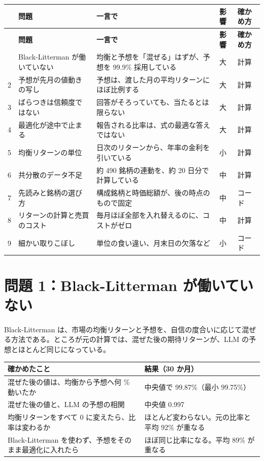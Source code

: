 \documentclass[xelatex,ja=standard,jafont=hiragino-pron,a4paper,10pt]{bxjsreport}
\begin{document}
\begin{longtable}{rp{4.40cm}p{6.20cm}p{1.60cm}p{1.60cm}}
\toprule
 & \textbf{問題} & \textbf{一言で} & \textbf{影響} & \textbf{確かめ方} \\
\midrule
\endfirsthead
\toprule
 & \textbf{問題} & \textbf{一言で} & \textbf{影響} & \textbf{確かめ方} \\
\midrule
\endhead
\bottomrule
\endfoot
1 & Black-Litterman が働いていない & 均衡と予想を「混ぜる」はずが、予想を 99.9\% 採用している & 大 & 計算 \\
2 & 予想が先月の値動きの写し & 予想は、渡した月の平均リターンにほぼ比例する & 大 & 計算 \\
3 & ばらつきは信頼度ではない & 回答がそろっていても、当たるとは限らない & 大 & 計算 \\
4 & 最適化が途中で止まる & 報告される比率は、式の最適な答えではない & 大 & 計算 \\
5 & 均衡リターンの単位 & 日次のリターンから、年率の金利を引いている & 小 & 計算 \\
6 & 共分散のデータ不足 & 約 490 銘柄の連動を、約 20 日分で計算している & 中 & 計算 \\
7 & 先読みと銘柄の選び方 & 構成銘柄と時価総額が、後の時点のもので固定 & 中 & コード \\
8 & リターンの計算と売買のコスト & 毎月ほぼ全部を入れ替えるのに、コストがゼロ & 中 & 計算 \\
9 & 細かい取りこぼし & 単位の食い違い、月末日の欠落など & 小 & コード \\
\end{longtable}

\section{問題 1：Black-Litterman が働いていない}

Black-Litterman は、市場の均衡リターンと予想を、自信の度合いに応じて混ぜる方法である。ところが元の計算では、混ぜた後の期待リターンが、LLM の予想とほとんど同じになっている。

\begin{longtable}{p{8.40cm}p{6.00cm}}
\toprule
\textbf{確かめたこと} & \textbf{結果（30 か月）} \\
\midrule
\endfirsthead
\bottomrule
\endfoot
混ぜた後の値は、均衡から予想へ何 \% 動いたか & 中央値で 99.87\%（最小 99.75\%） \\
混ぜた後の値と、LLM の予想の相関 & 中央値 0.997 \\
均衡リターンをすべて 0 に変えたら、比率は変わるか & ほとんど変わらない。元の比率と平均 92\% が重なる \\
Black-Litterman を使わず、予想をそのまま最適化に入れたら & ほぼ同じ比率になる。平均 89\% が重なる \\
\end{longtable}
\end{document}
